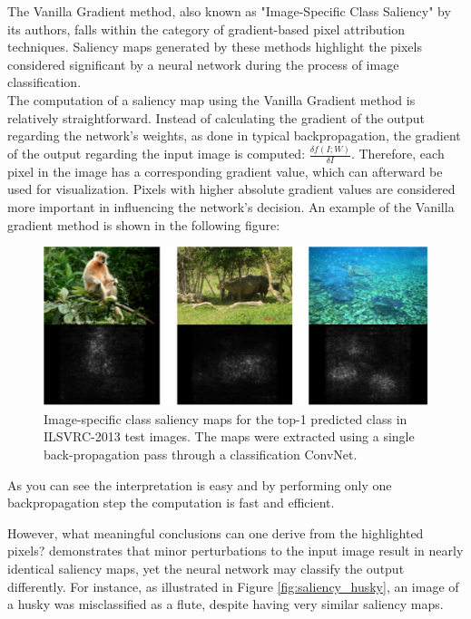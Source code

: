 The Vanilla Gradient method, also known as "Image-Specific Class Saliency" by its authors, falls within the category of gradient-based pixel attribution techniques. Saliency maps generated by these methods highlight the pixels considered significant by a neural network during the process of image classification.\\
The computation of a saliency map using the Vanilla Gradient method is relatively straightforward. Instead of calculating the gradient of the output regarding the network's weights, as done in typical backpropagation, the gradient of the output regarding the input image is computed: $\frac{\delta f(I;W)}{\delta I}$. Therefore, each pixel in the image has a corresponding gradient value, which can afterward be used for visualization. Pixels with higher absolute gradient values are considered more important in influencing the network's decision. An example of the Vanilla gradient method is shown in the following figure:

\begin{figure}[H]
    \centering
    \includegraphics[width=0.9\linewidth]{pics/sal_map.pdf}
    \caption[Image-specific class saliency maps.]{Image-specific class saliency maps for the top-1 predicted class in ILSVRC-2013 test images. The maps were extracted using a single back-propagation pass through a classification ConvNet.\cite{simonyan2014deep}}
    \label{fig:sal_ap}
\end{figure}
As you can see the interpretation is easy and by performing only one backpropagation step the computation is fast and efficient. 

However, what meaningful conclusions can one derive from the highlighted pixels? \cite{Ghorbani_Abid_Zou_2019} demonstrates that minor perturbations to the input image result in nearly identical saliency maps, yet the neural network may classify the output differently. For instance, as illustrated in Figure \ref{fig:saliency_husky}, an image of a husky was misclassified as a flute, despite having very similar saliency maps.

